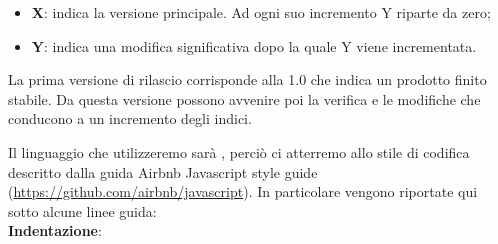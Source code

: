 \begin{itemize}
    \item \textbf{X}: indica la versione principale. Ad ogni suo incremento Y riparte da zero;
    \item \textbf{Y}: indica una modifica significativa dopo la quale Y viene incrementata. 
\end{itemize}
La prima versione di rilascio corrisponde alla 1.0 che indica un prodotto finito stabile. Da questa versione
possono avvenire poi la verifica e le modifiche che conducono a un incremento degli indici.


Il linguaggio che utilizzeremo sarà , perciò ci atterremo allo stile di codifica descritto dalla guida
Airbnb Javascript style guide (\url{https://github.com/airbnb/javascript}). In particolare vengono riportate qui sotto
alcune linee guida:\\
\textbf{Indentazione}:
